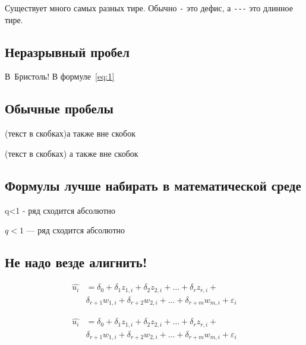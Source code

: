 \documentclass[12pt, a4paper]{article}
\begin{document}
Существует много самых разных тире.  Обычно 
\verb|-| это дефис, а \verb|---| это длинное тире.

\subsection{Неразрывный пробел}

В~Бристоль!  В формуле~\eqref{eq:1}

\subsection{Обычные пробелы}

(текст в скобках)а также вне скобок

(текст в скобках) а также вне скобок


\subsection{Формулы лучше набирать в математической среде}

q<1 - ряд сходится абсолютно 

$q < 1$ --- ряд сходится абсолютно 


\subsection{Не надо везде алигнить!}






  \begin{align}
\hat{u_i} &=\delta_0+\delta_1 z_{1,i} + \delta_2 z_{2,i}+ \ldots + \delta_r z_{r,i}+ \\
& \delta_{r+1} w_{1,i} + \delta_{r+2} w_{2,i} + \ldots + \delta_{r+m} w_{m,i} +\varepsilon_i  
 \tag{æææææ}
  \end{align} 

\vspace{5mm}

\begin{equation}
  \begin{align}
\hat{u_i} &=\delta_0+\delta_1 z_{1,i} + \delta_2 z_{2,i}+ \ldots + \delta_r z_{r,i}+ \\
& \delta_{r+1} w_{1,i} + \delta_{r+2} w_{2,i} + \ldots + \delta_{r+m} w_{m,i} +\varepsilon_i  
  \end{align} 
   \tag{æææææ}
\end{equation}
\end{document}
